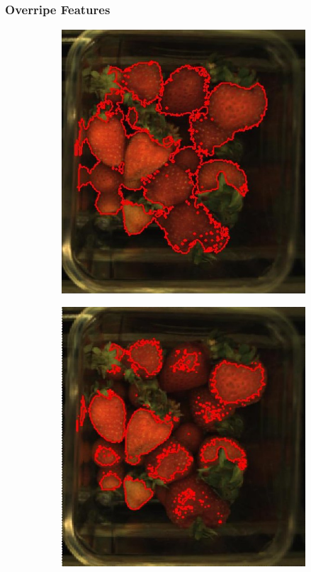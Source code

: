 \documentclass[conference]{IEEEtran}
\begin{document}
\subsubsection{Overripe Features}

\begin{figure}[ht]
	\centering
	\begin{subfigure}{.25\textwidth}
		\centering
		\includegraphics[width=.9\linewidth]{eps/over_berries.eps}
		\caption{}
		\label{fig:over_berries}
	\end{subfigure}%
	\begin{subfigure}{.25\textwidth}
		\centering
		\includegraphics[width=.9\linewidth]{eps/over_hue.eps}
		\caption{}
		\label{fig:over_hue}
	\end{subfigure}%
	

\end{figure}
\end{document}
